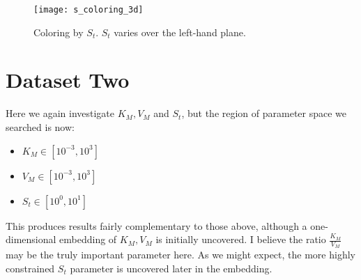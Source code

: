 \documentclass[11pt]{article}
\begin{document}
\begin{figure}[htbp]
  \centering
  \texttt{[image: s\_coloring\_3d]}
  \caption{Coloring by $S_t$. $S_t$ varies over the left-hand plane.}
  \label{fig:S}
\end{figure}

\clearpage

\section*{Dataset Two}

Here we again investigate $K_M, V_M$ and $S_t$, but the region of parameter space we searched is now:

\begin{itemize}
\item $K_M \in [10^{-3}, 10^{3}]$ 
\item $V_M \in [10^{-3}, 10^{3}]$ 
\item $S_t \in [10^{0}, 10^{1}]$ 
\end{itemize}

This produces results fairly complementary to those above, although a one-dimensional embedding of $K_M, V_M$ is initially uncovered. I believe the ratio $\frac{K_M}{V_M}$ may be the truly important parameter here. As we might expect, the more highly constrained $S_t$ parameter is uncovered later in the embedding.

% 
% 
\end{document}
